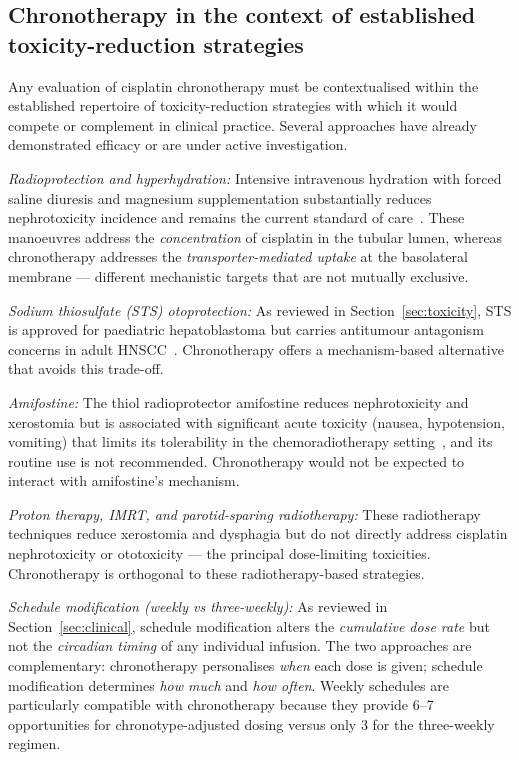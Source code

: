 \documentclass[preprint,review,12pt]{elsarticle}
\begin{document}
\subsection{Chronotherapy in the context of established toxicity-reduction strategies}

Any evaluation of cisplatin chronotherapy must be contextualised within the
established repertoire of toxicity-reduction strategies with which it would
compete or complement in clinical practice.  Several approaches have already
demonstrated efficacy or are under active investigation.

\emph{Radioprotection and hyperhydration:} Intensive intravenous hydration
with forced saline diuresis and magnesium supplementation substantially
reduces nephrotoxicity incidence and remains the current standard of
care~\cite{Manohar2018}.  These manoeuvres address the \emph{concentration}
of cisplatin in the tubular lumen, whereas chronotherapy addresses the
\emph{transporter-mediated uptake} at the basolateral membrane --- different
mechanistic targets that are not mutually exclusive.

\emph{Sodium thiosulfate (STS) otoprotection:} As reviewed in
Section~\ref{sec:toxicity}, STS is approved for paediatric hepatoblastoma
but carries antitumour antagonism concerns in adult HNSCC~\cite{Brock2018,
Freyer2017}.  Chronotherapy offers a mechanism-based alternative that avoids
this trade-off.

\emph{Amifostine:} The thiol radioprotector amifostine reduces nephrotoxicity
and xerostomia but is associated with significant acute toxicity (nausea,
hypotension, vomiting) that limits its tolerability in the chemoradiotherapy
setting~\cite{Szturz2017}, and its routine use is not recommended.
Chronotherapy would not be expected to interact with amifostine's mechanism.

\emph{Proton therapy, IMRT, and parotid-sparing radiotherapy:} These
radiotherapy techniques reduce xerostomia and dysphagia but do not directly
address cisplatin nephrotoxicity or ototoxicity --- the principal
dose-limiting toxicities.  Chronotherapy is orthogonal to these
radiotherapy-based strategies.

\emph{Schedule modification (weekly vs three-weekly):} As reviewed in
Section~\ref{sec:clinical}, schedule modification alters the
\emph{cumulative dose rate} but not the \emph{circadian timing} of any
individual infusion.  The two approaches are complementary: chronotherapy
personalises \emph{when} each dose is given; schedule modification
determines \emph{how much} and \emph{how often}.  Weekly schedules are
particularly compatible with chronotherapy because they provide 6--7
opportunities for chronotype-adjusted dosing versus only 3 for the
three-weekly regimen.
\end{document}
